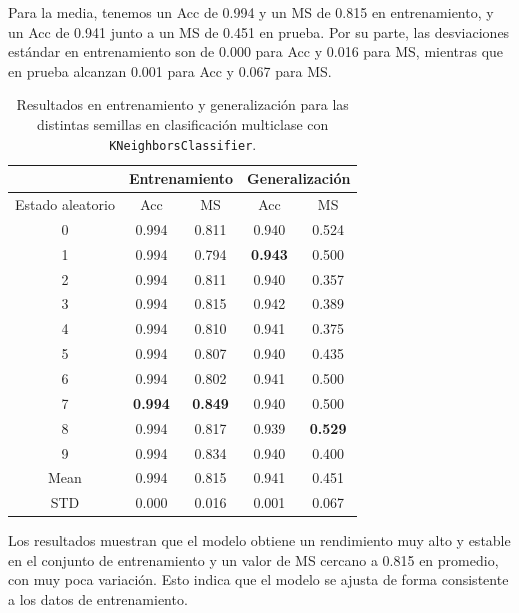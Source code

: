 Para la media, tenemos un Acc de 0.994 y un MS de 0.815 en entrenamiento, y un Acc de 0.941 junto a un MS de 0.451 en prueba. Por su parte, las desviaciones estándar en entrenamiento son de 0.000 para Acc y 0.016 para MS, mientras que en prueba alcanzan 0.001 para Acc y 0.067 para MS.
\begin{table}[H]
	\centering
	\begin{tabular}{ |c|c|c|c|c| }
		\hline
		\rowcolor{LightCyan}
		 & \multicolumn{2}{c|}{Entrenamiento} & \multicolumn{2}{c|}{Generalización} \\
		\hline
		\rowcolor{LightCyan}
		 Estado aleatorio & Acc & MS & Acc & MS \\
		\hline
		0    & 0.994          & 0.811          & 0.940          & 0.524          \\
		1    & 0.994          & 0.794          & \textbf{0.943} & 0.500          \\
		2    & 0.994          & 0.811          & 0.940          & 0.357          \\
		3    & 0.994          & 0.815          & 0.942          & 0.389          \\
		4    & 0.994          & 0.810          & 0.941          & 0.375          \\
		5    & 0.994          & 0.807          & 0.940          & 0.435          \\
		6    & 0.994          & 0.802          & 0.941          & 0.500          \\
		7    & \textbf{0.994} & \textbf{0.849} & 0.940          & 0.500          \\
		8    & 0.994          & 0.817          & 0.939          & \textbf{0.529} \\
		9    & 0.994          & 0.834          & 0.940          & 0.400          \\
		Mean & 0.994          & 0.815          & 0.941          & 0.451          \\
		STD  & 0.000          & 0.016          & 0.001          & 0.067          \\
		\hline
	\end{tabular}
	\caption{Resultados en entrenamiento y generalización para las distintas semillas en clasificación multiclase con \texttt{KNeighborsClassifier}.}
	\label{tabla:knn_multi}
\end{table}

Los resultados muestran que el modelo obtiene un rendimiento muy alto y estable en el conjunto de entrenamiento y un valor de MS cercano a 0.815 en promedio, con muy poca variación. Esto indica que el modelo se ajusta de forma consistente a los datos de entrenamiento.

